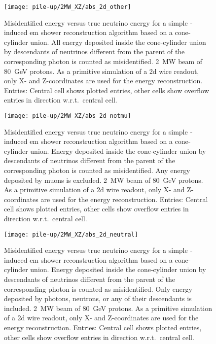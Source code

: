 \begin{figure}[tbp]
	\centering
	\texttt{[image: pile-up/2MW\_XZ/abs\_2d\_other]}
	\caption[Pile-up study misidentified vs.\ true neutrino energy, \SI{2}{\mega\watt} beam, XZ projection]{%
		Misidentified energy versus true neutrino energy for a simple \Pgpz-induced \acrshort{em} shower reconstruction algorithm based on a cone-cylinder union.
		All energy deposited inside the cone-cylinder union by descendants of neutrinos different from the parent of the corresponding \Pgpz photon is counted as misidentified.
		\SI{2}{\mega\watt} beam of \SI{80}{\giga\electronvolt} protons.
		As a primitive simulation of a \acrshort{2d} wire readout, only X- and Z-coordinates are used for the energy reconstruction.
		Entries: Central cell shows plotted entries, other cells show overflow entries in direction w.r.t.\ central cell.
	}
\end{figure}

\begin{figure}[tbp]
	\centering
	\texttt{[image: pile-up/2MW\_XZ/abs\_2d\_notmu]}
	\caption[Pile-up study misidentified vs.\ true neutrino energy, no muons, \SI{2}{\mega\watt} beam, XZ projection]{%
		Misidentified energy versus true neutrino energy for a simple \Pgpz-induced \acrshort{em} shower reconstruction algorithm based on a cone-cylinder union.
		Energy deposited inside the cone-cylinder union by descendants of neutrinos different from the parent of the corresponding \Pgpz photon is counted as misidentified.
		Any energy deposited by muons is excluded.
		\SI{2}{\mega\watt} beam of \SI{80}{\giga\electronvolt} protons.
		As a primitive simulation of a \acrshort{2d} wire readout, only X- and Z-coordinates are used for the energy reconstruction.
		Entries: Central cell shows plotted entries, other cells show overflow entries in direction w.r.t.\ central cell.
	}
\end{figure}

\begin{figure}[tbp]
	\centering
	\texttt{[image: pile-up/2MW\_XZ/abs\_2d\_neutral]}
	\caption[Pile-up study misidentified vs.\ true neutrino energy, only neutrals, \SI{2}{\mega\watt} beam, XZ projection]{%
		Misidentified energy versus true neutrino energy for a simple \Pgpz-induced \acrshort{em} shower reconstruction algorithm based on a cone-cylinder union.
		Energy deposited inside the cone-cylinder union by descendants of neutrinos different from the parent of the corresponding \Pgpz photon is counted as misidentified.
		Only energy deposited by photons, neutrons, or any of their descendants is included.
		\SI{2}{\mega\watt} beam of \SI{80}{\giga\electronvolt} protons.
		As a primitive simulation of a \acrshort{2d} wire readout, only X- and Z-coordinates are used for the energy reconstruction.
		Entries: Central cell shows plotted entries, other cells show overflow entries in direction w.r.t.\ central cell.
	}
\end{figure}

